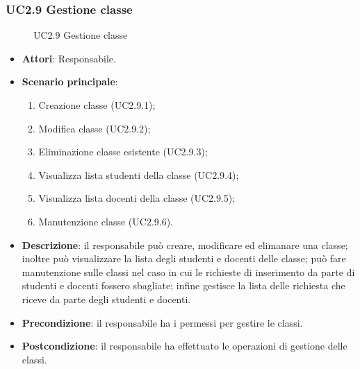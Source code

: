 \subsubsection{UC2.9 Gestione classe}
\begin{figure}[H]
\centering
\noindent{}
\caption{UC2.9 Gestione classe}
\end{figure}
\begin{itemize}
\item \textbf{Attori}: Responsabile.
\item \textbf{Scenario principale}:
\begin{enumerate}
\item Creazione classe (UC2.9.1);
\item Modifica classe (UC2.9.2);
\item Eliminazione classe esistente (UC2.9.3);
\item Visualizza lista studenti della classe (UC2.9.4);
\item Visualizza lista docenti della classe (UC2.9.5);
\item Manutenzione classe (UC2.9.6).
\end{enumerate}
\item \textbf{Descrizione}: il responsabile può creare, modificare ed elimanare una classe; inoltre può visualizzare la lista degli studenti e docenti delle classe; può fare manutenzione sulle classi nel caso in cui le richieste di inserimento da parte di studenti e docenti fossero sbagliate; infine gestisce la lista delle richiesta che riceve da parte degli studenti e docenti.
\item \textbf{Precondizione}: il responsabile ha i permessi per gestire le classi.
\item \textbf{Postcondizione}: il responsabile ha effettuato le operazioni di gestione delle classi.
\end{itemize}
